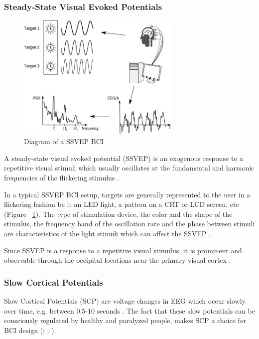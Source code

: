 \documentclass[12pt]{article}
\newcommand\mysubsubsection[1]{\subsubsection{#1}}
\numberwithin{equation}{section}
\numberwithin{figure}{section}
\numberwithin{table}{section}
\begin{document}
\mysubsubsection{Steady-State Visual Evoked Potentials}
\par{
    \begin{figure}[ht]
        \centering
        \includegraphics[width=0.7\textwidth]{images/ssvep_diagram}
        \caption[Diagram of a SSVEP BCI]{Diagram of a SSVEP BCI \citep{chumerin_decoding_2012}}
        \label{fig:eeg_ssvep_bci}
    \end{figure}
    A steady-state visual evoked potential (SSVEP) is an exogenous response
    to a repetitive visual stimuli which usually oscillates at the fundamental
    and harmonic frequencies of the flickering stimulus \citep{wu_stimulator_2008}.
}
\par{
    In a typical SSVEP BCI setup, targets are generally represented to the user
    in a flickering fashion be it an LED light, a pattern on a CRT or LCD screen, etc (Figure ~\ref{fig:eeg_ssvep_bci}).
    The type of stimulation device, the color and the shape of the stimulus,
    the frequency band of the oscillation rate and the phase between stimuli
    are characteristics of the light stimuli which can affect the SSVEP \citep{zhu_survey_2010}.
}
\par{
    Since SSVEP is a response to a repetitive visual stimulus, it is prominent
    and observable through the occipital locations near the primary visual
    cortex \citep{herrmann_human_2001}.
}
\newpage
\mysubsubsection{Slow Cortical Potentials}
\par{
    Slow Cortical Potentials (SCP) are voltage changes in EEG which occur
    slowly over time, e.g. between 0.5-10 seconds \citep{wolpaw_brain_2010}.
    The fact that these slow potentials can be consciously regulated
    by healthy and paralyzed people, makes SCP a choice for BCI design
    (\citealp{birbaumer_thought_2000}; \citealp{hinterberger_brain-computer_2004}; \citealp{birbaumer_breaking_2006}).
}
\end{document}
